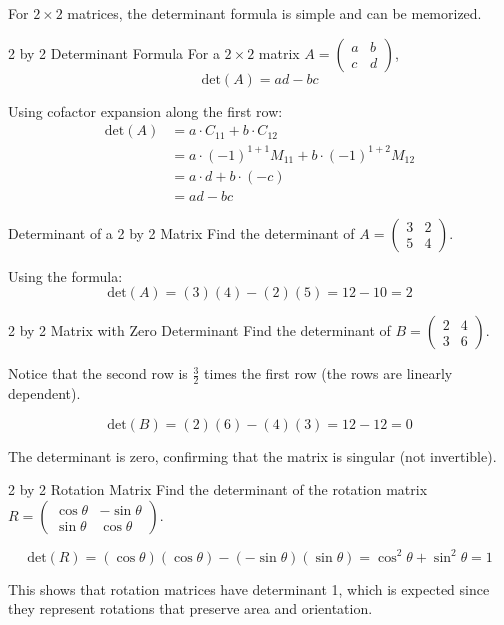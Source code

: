\documentclass[12pt,a4paper]{article}
\newcommand{\Det}{\text{det}}
\begin{document}
	For $2 \times 2$ matrices, the determinant formula is simple and can be memorized.
	
	\begin{proposition}{2 by 2 Determinant Formula}
		For a $2 \times 2$ matrix $A = \begin{pmatrix} a & b \\ c & d \end{pmatrix}$,
		\[
		\Det(A) = ad - bc
		\]
	\end{proposition}
	
	\begin{proofbox}
		
		Using cofactor expansion along the first row:
		\begin{align*}
			\Det(A) &= a \cdot C_{11} + b \cdot C_{12} \\
			&= a \cdot (-1)^{1+1} M_{11} + b \cdot (-1)^{1+2} M_{12} \\
			&= a \cdot d + b \cdot (-c) \\
			&= ad - bc
		\end{align*}
		
	\end{proofbox}
	
	\begin{example}{Determinant of a 2 by 2 Matrix}
		Find the determinant of $A = \begin{pmatrix} 3 & 2 \\ 5 & 4 \end{pmatrix}$.
		
		Using the formula:
		\[
		\Det(A) = (3)(4) - (2)(5) = 12 - 10 = 2
		\]
	\end{example}
	
	\begin{example}{2 by 2 Matrix with Zero Determinant}
		Find the determinant of $B = \begin{pmatrix} 2 & 4 \\ 3 & 6 \end{pmatrix}$.
		
		Notice that the second row is $\frac{3}{2}$ times the first row (the rows are linearly dependent).
		
		\[
		\Det(B) = (2)(6) - (4)(3) = 12 - 12 = 0
		\]
		
		The determinant is zero, confirming that the matrix is singular (not invertible).
	\end{example}
	
	\begin{example}{2 by 2 Rotation Matrix}
		Find the determinant of the rotation matrix $R = \begin{pmatrix} \cos\theta & -\sin\theta \\ \sin\theta & \cos\theta \end{pmatrix}$.
		
		\[
		\Det(R) = (\cos\theta)(\cos\theta) - (-\sin\theta)(\sin\theta) = \cos^2\theta + \sin^2\theta = 1
		\]
		
		This shows that rotation matrices have determinant 1, which is expected since they represent rotations that preserve area and orientation.
	\end{example}
	
\end{document}
